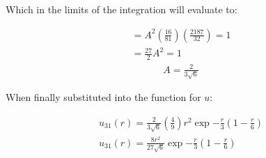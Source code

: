 \documentclass{article}
\begin{document}
    Which in the limits of the integration will evaluate to:

    \begin{gather*}
        = A^2(\frac{16}{81})(\frac{2187}{32})=1\\
        = \frac{27}{2}A^2 = 1
    \end{gather*}
    \begin{gather}
        A = \frac{2}{3\sqrt{6}}
    \end{gather}
        
    

    When finally substituted into the function for $u$:

    \begin{gather}
        u_{31}(r) = \frac{2}{3\sqrt{6}}(\frac{4}{9})r^2\exp{-\frac{r}{3}}(1-\frac{r}{6})\\
        u_{31}(r) = \frac{8r^2}{27\sqrt{6}}\exp{-\frac{r}{3}}(1-\frac{r}{6})
    \end{gather}
\end{document}
